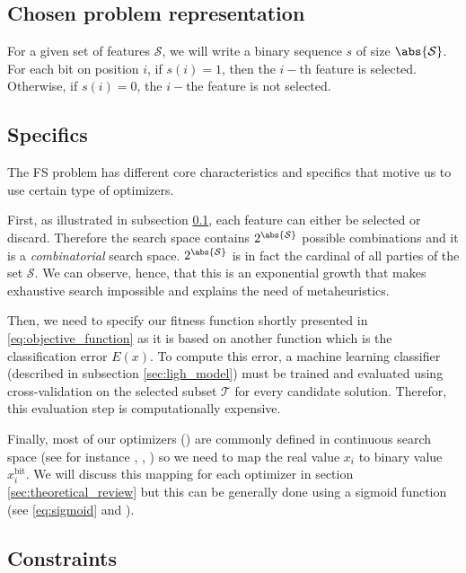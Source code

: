 \documentclass[12pt, openany]{article}
\begin{document}
\subsection{Chosen problem representation}\label{sec:chosen_problem_representation}

For a given set of features $\mathcal{S}$, we will write a binary sequence $s$ of size $\abs{\mathcal{S}}$. For each bit on position $i$, if $s(i)=1$, then the $i-$th feature is selected. Otherwise, if $s(i)=0$, the $i-$the feature is not selected.


\subsection{Specifics}\label{sec:specifics}

The FS problem has different core characteristics and specifics that motive us to use certain type of optimizers.

First, as illustrated in subsection \ref{sec:chosen_problem_representation}, each feature can either be selected or discard. Therefore the search space contains $2^{\abs{\mathcal{S}}}$ possible combinations and it is a \emph{combinatorial} search space. $2^{\abs{\mathcal{S}}}$ is in fact the cardinal of all parties of the set $\mathcal{S}$. We can observe, hence, that this is an exponential growth that makes exhaustive search impossible and explains the need of metaheuristics.

Then, we need to specify our fitness function shortly presented in \eqref{eq:objective_function} as it is based on another function which is the classification error $E(x)$. To compute this error, a machine learning classifier (described in subsection \ref{sec:ligh_model}) must be trained and evaluated using cross-validation on the selected subset $\mathcal{T}$ for every candidate solution. Therefor, this evaluation step is computationally expensive.

Finally, most of our optimizers () are commonly defined in continuous search space (see for instance \cite{przewozniczek_ga_basics}, \cite{przewozniczek_de}, \cite{przewozniczek_pso}) so we need to map the real value $x_i$ to binary value $x_i^{\text{bit}}$. We will discuss this mapping for each optimizer in section \ref{sec:theoretical_review} but this can be generally done using a sigmoid function (see \eqref{eq:sigmoid} and ).

\subsection{Constraints}\label{sec:constraints}
\end{document}
